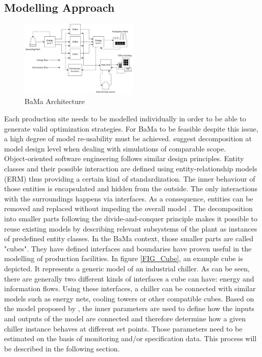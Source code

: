\documentclass[3p,times,procedia,twocolumn,twoside]{elsarticle}
\begin{document}
\subsection{Modelling Approach}
\begin{figure}
	\includegraphics[width=0.5\textwidth]{figures/modelstructure}
	\caption{BaMa Architecture}
	\label{FIG_Model}
\end{figure}
Each production site needs to be modelled individually in order to be able to generate valid optimization strategies. For BaMa to be feasible despite this issue, a high degree of model re-usability must be achieved. \cite{Balci2012,Setavoraphan2008} suggest decomposition at model design level when dealing with simulations of comparable scope.\\
Object-oriented software engineering follows similar design principles. Entity classes and their possible interaction are defined using entity-relationship models (ERM) thus providing a certain kind of standardization. The inner behaviour of those entities is encapsulated and hidden from the outside. The only interactions with the surroundings happens via interfaces. As a consequence, entities can be removed and replaced without impeding  the overall model \cite{Schatten2010}.
The decomposition into smaller parts following the divide-and-conquer principle makes it possible to reuse existing models by describing relevant subsystems of the plant as instances of predefined entity classes. In the BaMa context, those smaller parts are called "cubes". They have defined interfaces and boundaries have proven useful in the modelling of production facilities.
In figure \ref{FIG_Cube}, an example cube is depicted. It represents a generic model of an industrial chiller. As can be seen, there are generally two different kinds of interfaces a cube can have: energy and information flows. Using these interfaces, a chiller can be connected with similar models such as energy nets, cooling towers or other compatible cubes. Based on the model proposed by \cite{Hydeman2002}, the inner parameters are used to define how the inputs and outputs of the model are connected and therefore determine how a given chiller instance behaves at different set points. Those parameters need to be estimated on the basis of monitoring and/or specification data. This process will be described in the following section.
\end{document}
